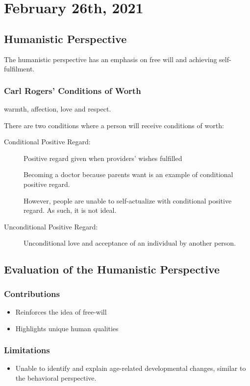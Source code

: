 \documentclass[../main/main.tex]{subfiles}
\begin{document}
\section{February 26th, 2021}
\subsection{Humanistic Perspective}
The humanistic perspective has an emphasis on free will and achieving self-fulfilment.
\subsubsection{Carl Rogers' Conditions of Worth}
\begin{definition} warmth, affection, love and respect.
\end{definition}
\begin{definition}
\end{definition}
There are two conditions where a person will receive conditions of worth:
\begin{description}
  \item[Conditional Positive Regard:] Positive regard given when providers' wishes fulfilled
        \begin{example}
Becoming a doctor because parents want is an example of conditional positive regard.
        \end{example}
        However, people are unable to self-actualize with conditional positive regard. As such, it is not ideal.
\item[Unconditional Positive Regard:] Unconditional love and acceptance of an individual by another person.
\end{description}
\subsection{Evaluation of the Humanistic Perspective}
\subsubsection{Contributions}
\begin{itemize}
  \item Reinforces the idea of free-will
        \item Highlights unique human qualities
\end{itemize}
\subsubsection{Limitations}
\begin{itemize}
\item Unable to identify and explain age-related developmental changes, similar to the behavioral perspective.
\end{itemize}
\end{document}

